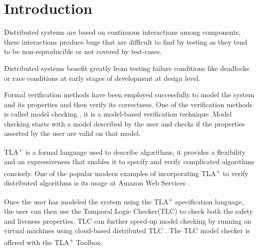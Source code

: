 \documentclass{thesul}
\newcommand{\tlaplus}{TLA\textsuperscript{+}\xspace}
\begin{document}
\WritePartLabelInToc
\WriteChapterLabelInToc


\tableofcontents

\NoChapterHead


\mainmatter


\chapter{Introduction}

Distributed systems are based on continuous interactions among components, these interactions produce bugs that are difficult to find by testing as they tend to be non-reproducible or not covered by test-cases.

Distributed systems benefit greatly from testing failure conditions like deadlocks or race conditions at early stages of development at design level.

Formal verification methods have been employed successfully to model the system and its properties and then verify its correctness. One of the verification methods is called model checking \cite{ModelCheckingTLA}, it is a model-based verification technique. Model checking starts with a model described by the user and checks if the properties asserted by the user are valid on that model. 

\tlaplus is a formal language used to describe algorithms, it provides a flexibility and an expressiveness that enables it to specify and verify complicated algorithms concisely. One of the popular modern examples of incorporating \tlaplus to verify distributed algorithms is its usage at Amazon Web Services \cite{amazon}.

Once the user has modeled the system using the \tlaplus specification language, the user can then use the Temporal Logic Checker(TLC) to check both the safety and liveness properties. TLC can further speed-up model checking by running on virtual machines using cloud-based distributed TLC \cite{cloudTLC}. The TLC model checker is offered with the \tlaplus Toolbox. 
\end{document}
